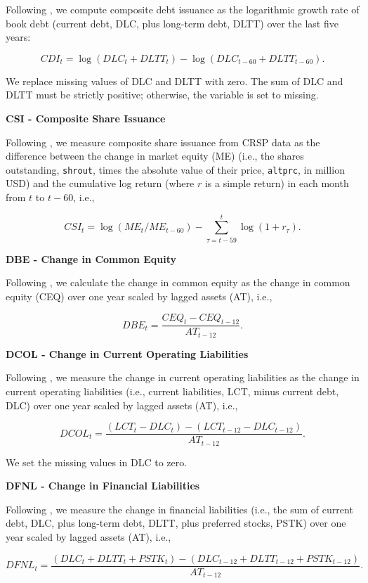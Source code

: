 \documentclass[
  article]{jss}
\begin{document}
Following \citet{lyandres.2008}, we compute composite debt issuance as
the logarithmic growth rate of book debt (current debt, DLC, plus
long-term debt, DLTT) over the last five years:

\[
CDI_t = \log(DLC_{t} + DLTT_{t}) - \log(DLC_{t-60} + DLTT_{t-60})\text{.}
\]

We replace missing values of DLC and DLTT with zero. The sum of DLC and
DLTT must be strictly positive; otherwise, the variable is set to
missing.

\textbf{CSI - Composite Share Issuance}

Following \citet{daniel.2006}, we measure composite share issuance from
CRSP data as the difference between the change in market equity (ME)
(i.e., the shares outstanding, \texttt{shrout}, times the absolute value
of their price, \texttt{altprc}, in million USD) and the cumulative log
return (where \(r\) is a simple return) in each month from \(t\) to
\(t-60\), i.e.,

\[
CSI_t = \log(ME_t / ME_{t-60}) - \sum^t_{\tau = t-59}\log(1 + r_{\tau})\text{.}
\]

\textbf{DBE - Change in Common Equity}

Following \citet{richardson.2005}, we calculate the change in common
equity as the change in common equity (CEQ) over one year scaled by
lagged assets (AT), i.e.,

\[
DBE_{t} = \frac{CEQ_{t} - CEQ_{t-12}}{AT_{t-12}}\text{.}
\]

\textbf{DCOL - Change in Current Operating Liabilities}

Following \citet{richardson.2005}, we measure the change in current
operating liabilities as the change in current operating liabilities
(i.e., current liabilities, LCT, minus current debt, DLC) over one year
scaled by lagged assets (AT), i.e.,

\[
DCOL_{t} = \frac{(LCT_{t} - DLC_{t}) - (LCT_{t-12} - DLC_{t-12})}{AT_{t-12}}\text{.}
\]

We set the missing values in DLC to zero.

\textbf{DFNL - Change in Financial Liabilities}

Following \citet{richardson.2005}, we measure the change in financial
liabilities (i.e., the sum of current debt, DLC, plus long-term debt,
DLTT, plus preferred stocks, PSTK) over one year scaled by lagged assets
(AT), i.e.,

\[
DFNL_{t} = \frac{(DLC_{t} + DLTT_{t} + PSTK_{t}) - (DLC_{t-12} + DLTT_{t-12} + PSTK_{t-12})}{AT_{t-12}}\text{.}
\]
\end{document}
